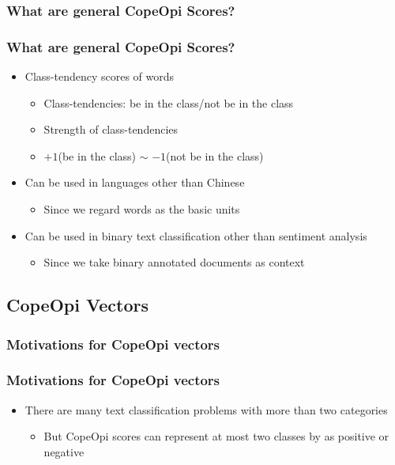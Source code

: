 \documentclass[mathserif]{beamer}
\begin{document}
\subsubsection{What are general CopeOpi Scores?}
\begin{frame}
\frametitle{What are general CopeOpi Scores?}
\begin{itemize}
\item Class-tendency scores of words
	\begin{itemize}
	\item Class-tendencies: be in the class/not be in the class
	\item Strength of class-tendencies
	\item $+1$(be in the class) $\sim$ $-1$(not be in the class)
	\end{itemize}
\item Can be used in languages other than Chinese
	\begin{itemize}
	\item Since we regard words as the basic units
	\end{itemize}
\item Can be used in binary text classification other than sentiment analysis
	\begin{itemize}
	\item Since we take binary annotated documents as context
	\end{itemize}
\end{itemize}
\end{frame}
\subsection{CopeOpi Vectors}
\subsubsection{Motivations for CopeOpi vectors}
\begin{frame}
\frametitle{Motivations for CopeOpi vectors}
\begin{itemize}
\item There are many text classification problems with more than two categories
	\begin{itemize}
	\item But CopeOpi scores can represent at most two classes by as positive or negative
	\end{itemize}
\end{itemize}
\end{frame}
\end{document}
